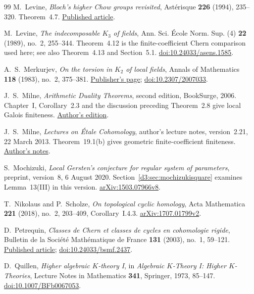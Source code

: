 \documentclass[11pt,a4paper]{amsart}
\numberwithin{equation}{section}
\theoremstyle{definition}
\theoremstyle{remark}
\begin{document}
\begin{thebibliography}{99}
M.~Levine,
\emph{Bloch's higher Chow groups revisited},
Ast\'erisque \textbf{226} (1994), 235--320. Theorem~4.7.
\href{https://www.numdam.org/item/AST_1994__226__235_0/}{Published article}.

M.~Levine, \emph{The indecomposable $K_3$ of fields}, Ann. Sci. \'Ecole Norm. Sup. (4) \textbf{22} (1989), no.~2, 255--344. Theorem~4.12 is the finite-coefficient Chern comparison used here; see also Theorem~4.13 and Section~5.1.
\href{https://doi.org/10.24033/asens.1585}{doi:10.24033/asens.1585}.

A.~S.~Merkurjev, \emph{On the torsion in $K_2$ of local fields}, Annals of Mathematics \textbf{118} (1983), no.~2, 375--381.
\href{https://annals.math.princeton.edu/1983/118-2/p06}{Publisher's page};
\href{https://doi.org/10.2307/2007033}{doi:10.2307/2007033}.

J.~S.~Milne, \emph{Arithmetic Duality Theorems}, second edition, BookSurge, 2006. Chapter~I, Corollary~2.3 and the discussion preceding Theorem~2.8 give local Galois finiteness.
\href{https://www.jmilne.org/math/Books/ADTnot.pdf}{Author's edition}.

J.~S.~Milne, \emph{Lectures on \'Etale Cohomology}, author's lecture notes, version~2.21, 22 March 2013. Theorem~19.1(b) gives geometric finite-coefficient finiteness.
\href{https://www.jmilne.org/math/CourseNotes/LEC.pdf}{Author's notes}.

S.~Mochizuki, \emph{Local Gersten's conjecture for regular system of parameters}, preprint, version~8, 6 August 2020. Section~\ref{d3:sec:mochizukisquare} examines Lemma~13(III) in this version.
\href{https://arxiv.org/abs/1503.07966v8}{arXiv:1503.07966v8}.

T.~Nikolaus and P.~Scholze, \emph{On topological cyclic homology},
Acta Mathematica \textbf{221} (2018), no.~2, 203--409, Corollary~I.4.3.
\href{https://arxiv.org/abs/1707.01799v2}{arXiv:1707.01799v2}.

D.~Petrequin, \emph{Classes de Chern et classes de cycles en
cohomologie rigide}, Bulletin de la Soci\'et\'e Math\'ematique
de France \textbf{131} (2003), no.~1, 59--121.
\href{https://www.numdam.org/article/BSMF_2003__131_1_59_0.pdf}
{Published article};
\href{https://doi.org/10.24033/bsmf.2437}{doi:10.24033/bsmf.2437}.

D.~Quillen, \emph{Higher algebraic $K$-theory I}, in \emph{Algebraic $K$-Theory I: Higher $K$-Theories}, Lecture Notes in Mathematics \textbf{341}, Springer, 1973, 85--147.
\href{https://doi.org/10.1007/BFb0067053}{doi:10.1007/BFb0067053}.


\end{thebibliography}
\end{document}

